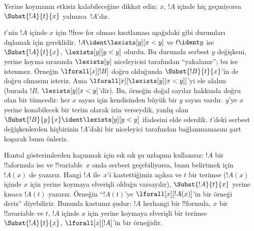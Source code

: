 \begin{explain}
Yerine koymanın etkisiz kalabileceğine dikkat edin: $x$, $!A$ içinde
hiç geçmiyorsa $\Subst{!A}{t}{x}$ yalnızca~$!A$'dır.

$t$'nin $!A$ içinde $x$ için !!{free for} olması kısıtlaması aşağıdaki
gibi durumları dışlamak için gereklidir. $!A \ident \lexists[y][x < y]$
ve $t \ident y$ ise $\Subst{!A}{t}{x}$, $\lexists[y][y < y]$ olurdu. Bu
durumda serbest $y$ değişkeni, yerine koyma sırasında $\lexists[y]$
niceleyicisi tarafından ``yakalanır''; bu ise istenmez. Örneğin
$\lforall[x][!B]$ doğru olduğunda $\Subst{!B}{t}{x}$'in de doğru
olmasını isteriz. Ama $\lforall[x][\lexists[y][x < y]]$'yi ele alalım
(burada $!B$, $\lexists[y][x < y]$'dir). Bu, örneğin doğal sayılar
hakkında doğru olan bir tümcedir: her $x$ sayısı için kendisinden büyük
bir $y$ sayısı vardır. $y$'ye $x$ yerine konabilecek bir terim olarak
izin verseydik, yanlış olan $\Subst{!B}{y}{x} \ident \lexists[y][y < y]$
ifadesini elde ederdik. $t$'deki serbest değişkenlerden hiçbirinin
$!A$'daki bir niceleyici tarafından bağlanmamasını şart koşarak bunu
önleriz.
\end{explain}

Hantal gösterimlerden kaçınmak için sık sık şu uzlaşımı kullanırız:
$!A$ bir !!a{formula} ise ve !!{variable}~$x$ onda serbest geçebiliyorsa,
bunu belirtmek için~$!A(x)$ de yazarız. Hangi $!A$ ile~$x$'i
kastettiğimiz açıksa ve $t$ bir terimse ($!A(x)$ içinde $x$ için yerine
koymaya elverişli olduğu varsayılır), $\Subst{!A}{t}{x}$ yerine kısaca
$!A(t)$ yazarız. Örneğin ``$!A(t)$'ye $\lforall[x][!A(x)]$'in bir
örneği deriz'' diyebiliriz. Bununla kastımız şudur: $!A$ herhangi bir
!!{formula}, $x$ bir !!a{variable} ve $t$, $!A$ içinde $x$ için yerine
koymaya elverişli bir terimse $\Subst{!A}{t}{x}$,
$\lforall[x][!A]$'in bir örneğidir.

